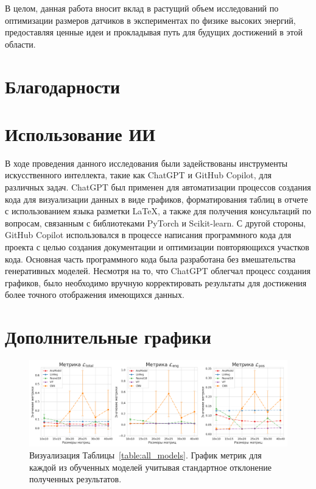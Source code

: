 \documentclass[a4paper,12pt]{extarticle}
\begin{document}
В целом, данная работа вносит вклад в растущий объем исследований по оптимизации размеров датчиков в экспериментах по физике высоких энергий, предоставляя ценные идеи и прокладывая путь для будущих достижений в этой области.

\section{Благодарности}

\section{Использование ИИ}

В ходе проведения данного исследования были задействованы инструменты искусственного интеллекта, такие как ChatGPT и GitHub Copilot, для различных задач. ChatGPT был применен для автоматизации процессов создания кода для визуализации данных в виде графиков, форматирования таблиц в отчете с использованием языка разметки LaTeX, а также для получения консультаций по вопросам, связанным с библиотеками PyTorch и Scikit-learn. С другой стороны, GitHub Copilot использовался в процессе написания программного кода для проекта с целью создания документации и оптимизации повторяющихся участков кода. Основная часть программного кода была разработана без вмешательства генеративных моделей. Несмотря на то, что ChatGPT облегчал процесс создания графиков, было необходимо вручную корректировать результаты для достижения более точного отображения имеющихся данных.

\newpage 
\printbibliography[heading=bibintoc] 


\newpage
\appendix

\section{Дополнительные графики}

\begin{figure}[ht]
    \centering
    \includegraphics[width=1.0\textwidth]{graphics/models_comp_extra.png}
    \caption{Визуализация Таблицы~\ref{table:all_models}. График метрик для каждой из обученных моделей учитывая стандартное отклонение полученных результатов.}
    \label{graph:all_models_extra}
\end{figure}
\end{document}
